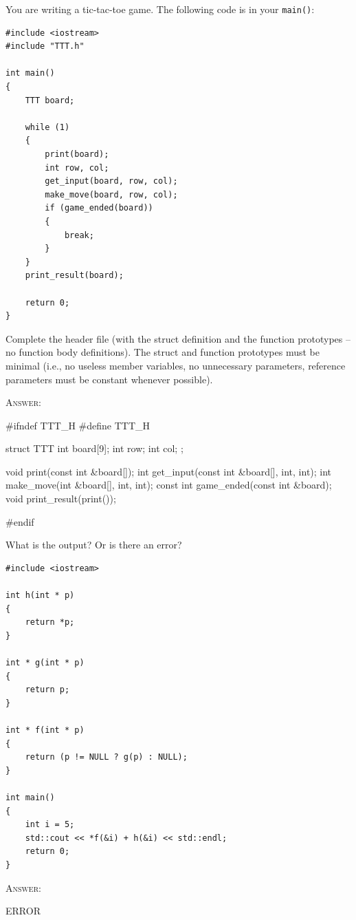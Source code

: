\newpage
\nextq
You are writing a tic-tac-toe game. The following code is in your
\verb!main()!:
\vspace{-3mm}
\begin{Verbatim}[frame=single,fontsize=\small]
#include <iostream>
#include "TTT.h"

int main()
{
    TTT board;

    while (1)
    {
        print(board);
        int row, col;
        get_input(board, row, col);
        make_move(board, row, col);
        if (game_ended(board)) 
        {
            break;
        }
    }
    print_result(board);

    return 0;
}
\end{Verbatim}
\vspace{-4mm}
Complete the header file (with the struct definition and the function
prototypes -- no function body definitions).
The struct and function prototypes must be minimal
(i.e., no useless member variables, no unnecessary parameters,
reference parameters must be constant whenever possible).

\textsc{Answer:}\vspace{-2mm}
\begin{answercode}
#ifndef TTT_H
#define TTT_H

struct TTT
{
  int board[9];
  int row;
  int col;
};

void print(const int &board[]);
int get_input(const int &board[], int, int);
int make_move(int &board[], int, int);
const int game_ended(const int &board);
void print_result(print());

#endif
\end{answercode}

\newpage
\nextq
What is the output? Or is there an error?
\begin{Verbatim}[frame=single,fontsize=\small]
#include <iostream>

int h(int * p)
{
    return *p;
}

int * g(int * p)
{
    return p;
}

int * f(int * p)
{
    return (p != NULL ? g(p) : NULL);
}

int main()
{
    int i = 5;
    std::cout << *f(&i) + h(&i) << std::endl;
    return 0;
}
\end{Verbatim}

\textsc{Answer:}\vspace{-2mm}
\begin{answercode}
ERROR
\end{answercode}

